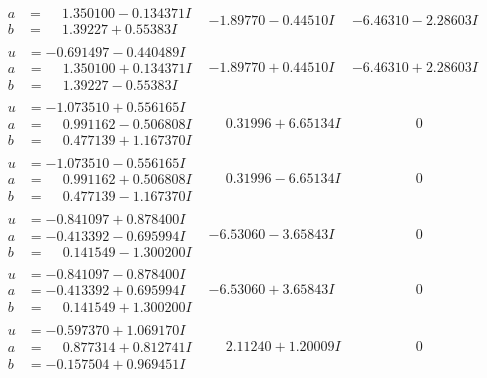 \documentclass[1p]{elsarticle_modified}
\theoremstyle{definition}
\begin{document}
$$\begin{array}{c|c|c}
\begin{aligned}
a &= \phantom{-}1.350100 - 0.134371 I \\
b &= \phantom{-}1.39227 + 0.55383 I\end{aligned}
 & -1.89770 - 0.44510 I & -6.46310 - 2.28603 I \\ \hline\begin{aligned}
u &= -0.691497 - 0.440489 I \\
a &= \phantom{-}1.350100 + 0.134371 I \\
b &= \phantom{-}1.39227 - 0.55383 I\end{aligned}
 & -1.89770 + 0.44510 I & -6.46310 + 2.28603 I \\ \hline\begin{aligned}
u &= -1.073510 + 0.556165 I \\
a &= \phantom{-}0.991162 - 0.506808 I \\
b &= \phantom{-}0.477139 + 1.167370 I\end{aligned}
 & \phantom{-}0.31996 + 6.65134 I & \phantom{-0.000000 } 0 \\ \hline\begin{aligned}
u &= -1.073510 - 0.556165 I \\
a &= \phantom{-}0.991162 + 0.506808 I \\
b &= \phantom{-}0.477139 - 1.167370 I\end{aligned}
 & \phantom{-}0.31996 - 6.65134 I & \phantom{-0.000000 } 0 \\ \hline\begin{aligned}
u &= -0.841097 + 0.878400 I \\
a &= -0.413392 - 0.695994 I \\
b &= \phantom{-}0.141549 - 1.300200 I\end{aligned}
 & -6.53060 - 3.65843 I & \phantom{-0.000000 } 0 \\ \hline\begin{aligned}
u &= -0.841097 - 0.878400 I \\
a &= -0.413392 + 0.695994 I \\
b &= \phantom{-}0.141549 + 1.300200 I\end{aligned}
 & -6.53060 + 3.65843 I & \phantom{-0.000000 } 0 \\ \hline\begin{aligned}
u &= -0.597370 + 1.069170 I \\
a &= \phantom{-}0.877314 + 0.812741 I \\
b &= -0.157504 + 0.969451 I\end{aligned}
 & \phantom{-}2.11240 + 1.20009 I & \phantom{-0.000000 } 0 \\ \hline\begin{aligned}

\end{aligned}
\end{array}$$
\end{document}
